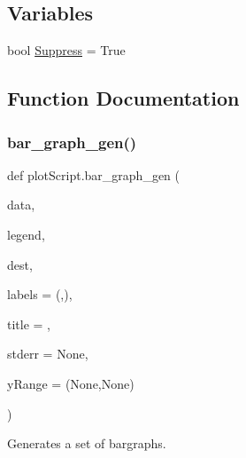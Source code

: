 \subsection*{Variables}
\begin{DoxyCompactItemize}
\item 
bool \mbox{\hyperlink{namespaceplot_script_a77f7e6339aa22b7bcddf69dd76df1bcb}{Suppress}} = True
\end{DoxyCompactItemize}


\subsection{Function Documentation}
\mbox{\label{namespaceplot_script_ac3cc0076fbd782e94e304d688f05fc13}} 
\subsubsection{\texorpdfstring{bar\_graph\_gen()}{bar\_graph\_gen()}}
{\footnotesize\ttfamily def plot\+Script.\+bar\+\_\+graph\+\_\+gen (\begin{DoxyParamCaption}\item[{}]{data,  }\item[{}]{legend,  }\item[{}]{dest,  }\item[{}]{labels = {\ttfamily (\textquotesingle{}\textquotesingle{},\textquotesingle{}\textquotesingle{})},  }\item[{}]{title = {\ttfamily \textquotesingle{}\textquotesingle{}},  }\item[{}]{stderr = {\ttfamily None},  }\item[{}]{y\+Range = {\ttfamily (None,None)} }\end{DoxyParamCaption})}



Generates a set of bargraphs. 


